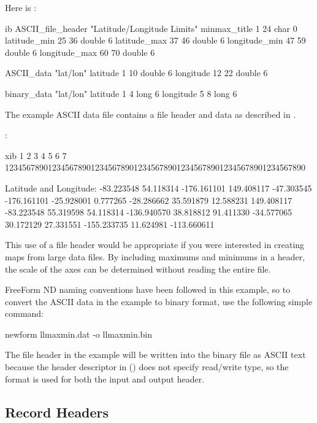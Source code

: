 Here is :

\begin{vcode}{ib}
ASCII_file_header "Latitude/Longitude Limits"
minmax_title 1 24 char 0
latitude_min 25 36 double 6
latitude_max 37 46 double 6
longitude_min 47 59 double 6
longitude_max 60 70 double 6

ASCII_data "lat/lon"
latitude 1 10 double 6
longitude 12 22 double 6

binary_data "lat/lon"
latitude 1 4 long 6
longitude 5 8 long 6 
\end{vcode}

The example ASCII data file  contains a file header
and data as described in .

:

\begin{vcode}{xib}
         1         2         3         4         5         6         7
1234567890123456789012345678901234567890123456789012345678901234567890

Latitude and Longitude:   -83.223548 54.118314  -176.161101 149.408117
-47.303545 -176.161101
-25.928001    0.777265
-28.286662   35.591879
 12.588231  149.408117
-83.223548   55.319598
 54.118314 -136.940570
 38.818812   91.411330
-34.577065   30.172129
 27.331551 -155.233735
 11.624981 -113.660611 
\end{vcode}

This use of a file header would be appropriate if you were interested
in creating maps from large data files. By including maximums and
minimums in a header, the scale of the axes can be determined without
reading the entire file.

FreeForm ND naming conventions have been followed in this example, so
to convert the ASCII data in the example to binary format, use the
following simple command:

\begin{example}
newform llmaxmin.dat -o llmaxmin.bin 
\end{example}

The file header in the example will be written into the binary file as
ASCII text because the header descriptor in 
() does not specify read/write type, so the
format is used for both the input and output header.

\subsection{Record Headers}

